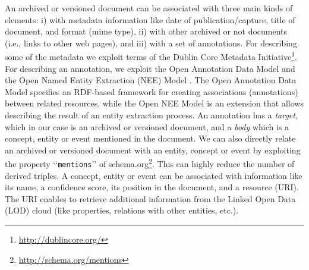 \documentclass{libtex/sig-alternate-05-2015}
\newcommand{\q}[1]{\lq\lq{}{}#1\rq\rq{}{}}
\begin{document}
An archived or versioned document
can be associated with three main kinds of elements:
i) with metadata information like date of publication/capture,
title of document, and format (mime type),
ii) with other archived or not documents (i.e., links to other web pages), and
iii) with a set of annotations.
For describing some of the metadata we exploit terms of the
Dublin Core Metadata Initiative\footnote{\url{http://dublincore.org/}}.
For describing an annotation, we exploit
the Open Annotation Data Model \cite{sanderson2013open}
and the Open Named Entity Extraction (NEE) Model \cite{fafalios2015ijait}. %
The Open Annotation Data Model specifies an RDF-based framework for creating associations (annotations)
between related resources, while the Open NEE Model is an extension
that allows describing the result of an entity extraction process.
An annotation has a {\em target}, which in our case is an archived or versioned document, and
a {\em body} which is a concept, entity or event
mentioned in the document.
We can also directly relate an archived or versioned document with an
entity, concept or event by exploiting the property \q{{\tt mentions}}
of schema.org\footnote{\url{http://schema.org/mentions}}.
This can highly reduce the number of derived triples.
A concept, entity or event can be associated with information like
its name, a confidence score, its position in the document, and a resource (URI).
The URI enables to retrieve additional information from the Linked Open Data (LOD)
cloud \cite{heath2011linked} (like properties, relations with other entities, etc.).
\end{document}
